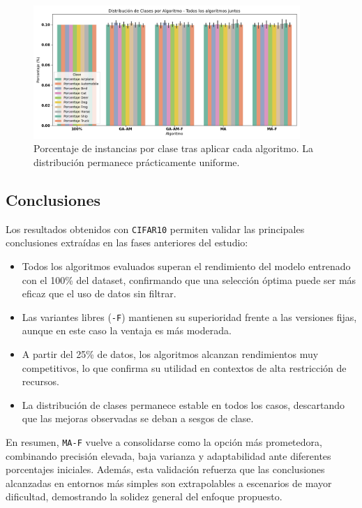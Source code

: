 \begin{figure}[htp]
    \centering
    \includegraphics[width=0.9\textwidth]{imagenes/evaluaciones/cifar10/balance-de-clases.png}
    \caption{Porcentaje de instancias por clase tras aplicar cada algoritmo. La distribución permanece prácticamente uniforme.}
    \label{fig:cifar10_balance}
\end{figure}

\subsection{Conclusiones}

Los resultados obtenidos con \texttt{CIFAR10} permiten validar las principales conclusiones extraídas en las fases anteriores del estudio:

\begin{itemize}
    \item Todos los algoritmos evaluados superan el rendimiento del modelo entrenado con el 100\% del dataset, confirmando que una selección óptima puede ser más eficaz que el uso de datos sin filtrar.
    \item Las variantes libres (\texttt{-F}) mantienen su superioridad frente a las versiones fijas, aunque en este caso la ventaja es más moderada.
    \item A partir del 25\% de datos, los algoritmos alcanzan rendimientos muy competitivos, lo que confirma su utilidad en contextos de alta restricción de recursos.
    \item La distribución de clases permanece estable en todos los casos, descartando que las mejoras observadas se deban a sesgos de clase.
\end{itemize}

En resumen, \texttt{MA-F} vuelve a consolidarse como la opción más prometedora, combinando precisión elevada, baja varianza y adaptabilidad ante diferentes porcentajes iniciales. Además, esta validación refuerza que las conclusiones alcanzadas en entornos más simples son extrapolables a escenarios de mayor dificultad, demostrando la solidez general del enfoque propuesto.
